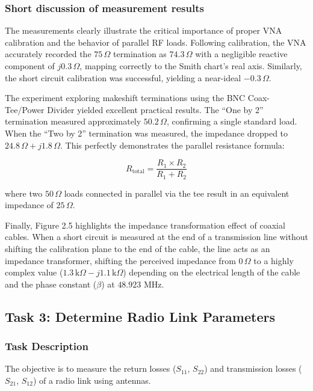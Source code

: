 \FloatBarrier

\subsubsection{Short discussion of measurement results}

The measurements clearly illustrate the critical importance of proper VNA calibration and the behavior of parallel RF loads. Following calibration, the VNA accurately recorded the $75\,\Omega$ termination as $74.3\,\Omega$ with a negligible reactive component of $j0.3\,\Omega$, mapping correctly to the Smith chart's real axis. Similarly, the short circuit calibration was successful, yielding a near-ideal $-0.3\,\Omega$.

The experiment exploring makeshift terminations using the BNC Coax-Tee/Power Divider yielded excellent practical results. The ``One by 2'' termination measured approximately $50.2\,\Omega$, confirming a single standard load. When the ``Two by 2'' termination was measured, the impedance dropped to $24.8\,\Omega + j1.8\,\Omega$. This perfectly demonstrates the parallel resistance formula:

\begin{equation}
    R_{\text{total}} = \frac{R_1 \times R_2}{R_1 + R_2}
\end{equation}

where two $50\,\Omega$ loads connected in parallel via the tee result in an equivalent impedance of $25\,\Omega$.

Finally, Figure 2.5 highlights the impedance transformation effect of coaxial cables. When a short circuit is measured at the end of a transmission line without shifting the calibration plane to the end of the cable, the line acts as an impedance transformer, shifting the perceived impedance from $0\,\Omega$ to a highly complex value ($1.3\,\text{k}\Omega - j1.1\,\text{k}\Omega$) depending on the electrical length of the cable and the phase constant ($\beta$) at $48.923$ MHz.

\subsection{Task 3: Determine Radio Link Parameters}

\subsubsection{Task Description}
The objective is to measure the return losses ($S_{11}$, $S_{22}$) and transmission losses ($S_{21}$, $S_{12}$) of a radio link using antennas.


